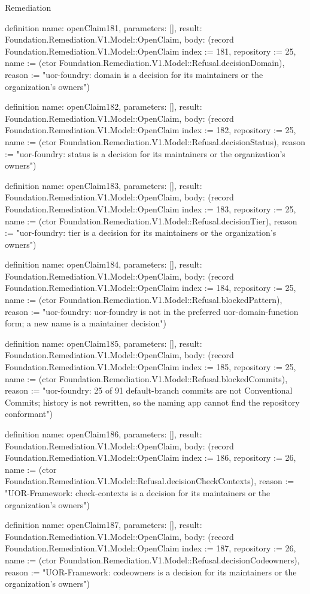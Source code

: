 \begin{lexlean}{Remediation}
\begin{semanticmodule}
definition{
  name: openClaim181,
  parameters: [],
  result: Foundation.Remediation.V1.Model::OpenClaim,
  body: (record Foundation.Remediation.V1.Model::OpenClaim {index := 181, repository := 25, name := (ctor Foundation.Remediation.V1.Model::Refusal.decisionDomain), reason := "uor-foundry: domain is a decision for its maintainers or the organization's owners"})
}

definition{
  name: openClaim182,
  parameters: [],
  result: Foundation.Remediation.V1.Model::OpenClaim,
  body: (record Foundation.Remediation.V1.Model::OpenClaim {index := 182, repository := 25, name := (ctor Foundation.Remediation.V1.Model::Refusal.decisionStatus), reason := "uor-foundry: status is a decision for its maintainers or the organization's owners"})
}

definition{
  name: openClaim183,
  parameters: [],
  result: Foundation.Remediation.V1.Model::OpenClaim,
  body: (record Foundation.Remediation.V1.Model::OpenClaim {index := 183, repository := 25, name := (ctor Foundation.Remediation.V1.Model::Refusal.decisionTier), reason := "uor-foundry: tier is a decision for its maintainers or the organization's owners"})
}

definition{
  name: openClaim184,
  parameters: [],
  result: Foundation.Remediation.V1.Model::OpenClaim,
  body: (record Foundation.Remediation.V1.Model::OpenClaim {index := 184, repository := 25, name := (ctor Foundation.Remediation.V1.Model::Refusal.blockedPattern), reason := "uor-foundry: uor-foundry is not in the preferred uor-{domain}-{function} form; a new name is a maintainer decision"})
}

definition{
  name: openClaim185,
  parameters: [],
  result: Foundation.Remediation.V1.Model::OpenClaim,
  body: (record Foundation.Remediation.V1.Model::OpenClaim {index := 185, repository := 25, name := (ctor Foundation.Remediation.V1.Model::Refusal.blockedCommits), reason := "uor-foundry: 25 of 91 default-branch commits are not Conventional Commits; history is not rewritten, so the naming app cannot find the repository conformant"})
}

definition{
  name: openClaim186,
  parameters: [],
  result: Foundation.Remediation.V1.Model::OpenClaim,
  body: (record Foundation.Remediation.V1.Model::OpenClaim {index := 186, repository := 26, name := (ctor Foundation.Remediation.V1.Model::Refusal.decisionCheckContexts), reason := "UOR-Framework: check-contexts is a decision for its maintainers or the organization's owners"})
}

definition{
  name: openClaim187,
  parameters: [],
  result: Foundation.Remediation.V1.Model::OpenClaim,
  body: (record Foundation.Remediation.V1.Model::OpenClaim {index := 187, repository := 26, name := (ctor Foundation.Remediation.V1.Model::Refusal.decisionCodeowners), reason := "UOR-Framework: codeowners is a decision for its maintainers or the organization's owners"})
}


\end{semanticmodule}
\end{lexlean}
